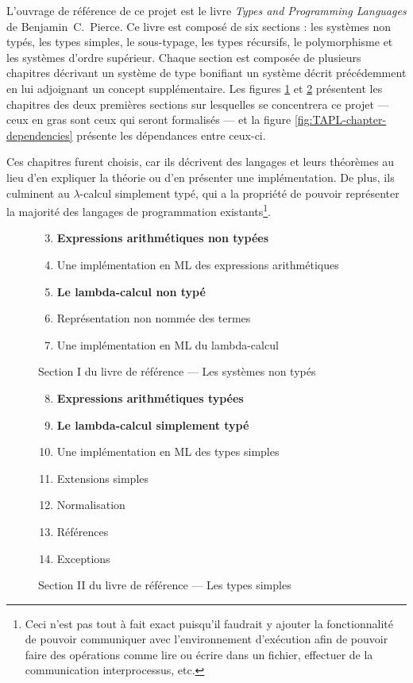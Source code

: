 \documentclass[a4paper, oneside, 12pt, titlepage]{article}
\begin{document}
L'ouvrage de référence de ce projet est le livre \emph{Types and Programming Languages} de
Benjamin~C.~Pierce. Ce livre est composé de six sections : les systèmes non typés, les types
simples, le sous-typage, les types récursifs, le polymorphisme et les systèmes d'ordre supérieur.
Chaque section est composée de plusieurs chapitres décrivant un système de type bonifiant un système
décrit précédemment en lui adjoignant un concept supplémentaire. Les figures
\ref{fig:TAPL-section-1} et \ref{fig:TAPL-section-2} présentent les chapitres des deux premières
sections sur lesquelles se concentrera ce projet --- ceux en gras sont ceux qui seront formalisés
--- et la figure \ref{fig:TAPL-chapter-dependencies} présente les dépendances entre ceux-ci.

Ces chapitres furent choisis, car ils décrivent des langages et leurs théorèmes au lieu d'en
expliquer la théorie ou d'en présenter une implémentation. De plus, ils culminent au
$\lambda$-calcul simplement typé, qui a la propriété de pouvoir représenter la majorité des langages
de programmation existants\footnote{Ceci n'est pas tout à fait exact puisqu'il faudrait y ajouter la
fonctionnalité de pouvoir communiquer avec l'environnement d'exécution afin de pouvoir faire des
opérations comme lire ou écrire dans un fichier, effectuer de la communication interprocessus,
etc.}.

\begin{figure}[h]
  \begin{enumerate}[label=§ \arabic*]
      \setcounter{enumi}{2}
    \item \textbf{Expressions arithmétiques non typées}
    \item Une implémentation en ML des expressions arithmétiques
    \item \textbf{Le lambda-calcul non typé}
    \item Représentation non nommée des termes
    \item Une implémentation en ML du lambda-calcul
  \end{enumerate}
  \caption{Section I du livre de référence --- Les systèmes non typés}
  \label{fig:TAPL-section-1}
\end{figure}

\begin{figure}[h]
  \begin{enumerate}[label=§ \arabic*]
      \setcounter{enumi}{7}
    \item \textbf{Expressions arithmétiques typées}
    \item \textbf{Le lambda-calcul simplement typé}
    \item Une implémentation en ML des types simples
    \item Extensions simples
    \item Normalisation
    \item Références
    \item Exceptions
  \end{enumerate}
  \caption{Section II du livre de référence --- Les types simples}
  \label{fig:TAPL-section-2}
\end{figure}
\end{document}

